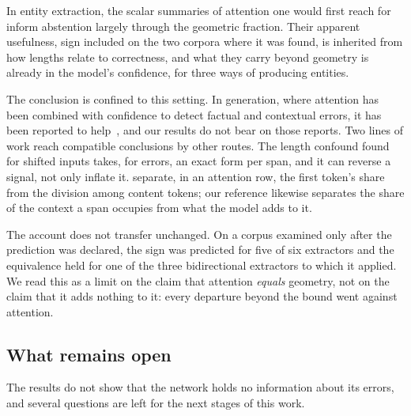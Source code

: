 \documentclass[11pt,a4paper]{article}
\begin{document}
In entity extraction, the scalar summaries of attention one would first reach for inform abstention largely through the
geometric fraction. Their apparent usefulness, sign included on the two corpora where it was found, is inherited from how
lengths relate to correctness, and what they carry beyond geometry is already in the model's confidence, for three ways of
producing entities.

The conclusion is confined to this setting. In generation, where attention has been combined with confidence to
detect factual and contextual errors, it has been reported to help~\citep{yuksekgonul2023attention,vazhentsev2025rauq}, and our
results do not bear on those reports. Two lines of work reach compatible conclusions by other
routes. The length confound \citet{saghir2026twopathway} found for shifted inputs takes, for errors, an exact form per span,
and it can reverse a signal, not only inflate it. \citet{papamichalis2026attentionrows} separate, in an attention row, the
first token's share from the division among content tokens; our reference likewise separates the share of the context a span
occupies from what the model adds to it.

The account does not transfer unchanged. On a corpus examined only after the prediction was declared, the sign was predicted
for five of six extractors and the equivalence held for one of the three bidirectional extractors to which it applied. We read
this as a limit on the claim that attention \emph{equals} geometry, not on the claim that it adds nothing to it: every
departure beyond the bound went against attention.

\subsection{What remains open}
\label{sec:open}

The results do not show that the network holds no information about its errors, and several questions are left for the
next stages of this work.
\end{document}
